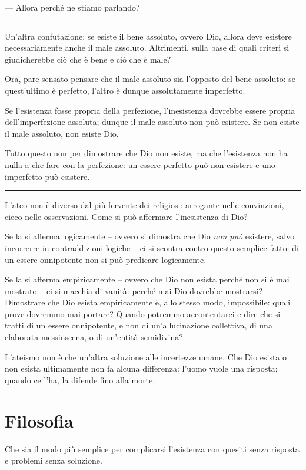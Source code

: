 \documentclass[a4paper,oneside,11pt]{memoir}
\begin{document}
--- Allora perché ne stiamo parlando?

\plainbreak{1}

Un'altra confutazione: se esiste il bene assoluto, ovvero Dio, allora deve
esistere necessariamente anche il male assoluto. Altrimenti, sulla base di quali
criteri si giudicherebbe ciò che è bene e ciò che è male?

Ora, pare sensato pensare che il male assoluto sia l'opposto del bene assoluto:
se quest'ultimo è perfetto, l'altro è dunque assolutamente imperfetto.

Se l'esistenza fosse propria della perfezione, l'inesistenza dovrebbe essere
propria dell'imperfezione assoluta; dunque il male assoluto non può esistere. Se
non esiste il male assoluto, non esiste Dio.

Tutto questo non per dimostrare che Dio non esiste, ma che l'esistenza non ha
nulla a che fare con la perfezione: un essere perfetto può non esistere e uno
imperfetto può esistere.

\plainbreak{1}

L'ateo non è diverso dal più fervente dei religiosi: arrogante nelle
convinzioni, cieco nelle osservazioni. Come si può affermare l'inesistenza di
Dio?

Se la si afferma logicamente -- ovvero si dimostra che Dio \emph{non può}
esistere, salvo incorrerre in contraddizioni logiche -- ci si scontra contro
questo semplice fatto: di un essere onnipotente non si può predicare
logicamente.

Se la si afferma empiricamente -- ovvero che Dio non esista perché non si è mai
mostrato -- ci si macchia di vanità: perché mai Dio dovrebbe mostrarsi?
Dimostrare che Dio esista empiricamente è, allo stesso modo, impossibile: quali
prove dovremmo mai portare? Quando potremmo accontentarci e dire che si tratti
di un essere onnipotente, e non di un'allucinazione collettiva, di una elaborata
messinscena, o di un'entità semidivina?

L'ateismo non è che un'altra soluzione alle incertezze umane. Che Dio esista o
non esista ultimamente non fa alcuna differenza: l'uomo vuole una risposta;
quando ce l'ha, la difende fino alla morte.

\chapter{Filosofia}

Che sia il modo più semplice per complicarsi l'esistenza con quesiti senza
risposta e problemi senza soluzione.
\end{document}
